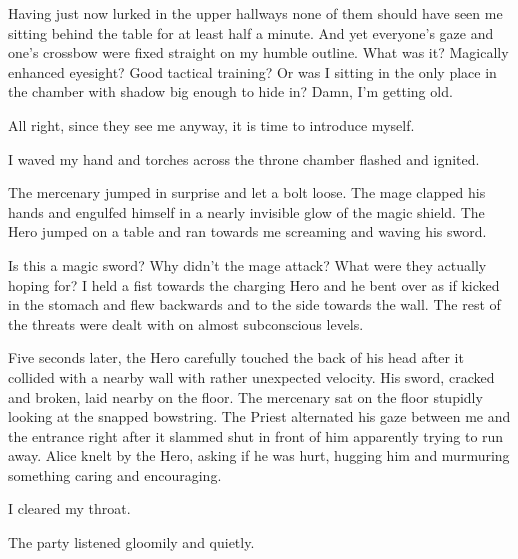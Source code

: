 Having just now lurked in the upper hallways none of them should have seen me sitting behind the table for at least half a minute. And yet everyone's gaze and one's crossbow were fixed straight on my humble outline. What was it? Magically enhanced eyesight? Good tactical training? Or was I sitting in the only place in the chamber with shadow big enough to hide in? Damn, I'm getting old.

All right, since they see me anyway, it is time to introduce myself.

 I waved my hand and torches across the throne chamber flashed and ignited. 

The mercenary jumped in surprise and let a bolt loose. The mage clapped his hands and engulfed himself in a nearly invisible glow of the magic shield. The Hero jumped on a table and ran towards me screaming and waving his sword.

Is this a magic sword? Why didn't the mage attack? What were they actually hoping for? I held a fist towards the charging Hero and he bent over as if kicked in the stomach and flew backwards and to the side towards the wall. The rest of the threats were dealt with on almost subconscious levels.

Five seconds later, the Hero carefully touched the back of his head after it collided with a nearby wall with rather unexpected velocity. His sword, cracked and broken, laid nearby on the floor. The mercenary sat on the floor stupidly looking at the snapped bowstring. The Priest alternated his gaze between me and the entrance right after it slammed shut in front of him apparently trying to run away. Alice knelt by the Hero, asking if he was hurt, hugging him and murmuring something caring and encouraging.

I cleared my throat.


The party listened gloomily and quietly.


